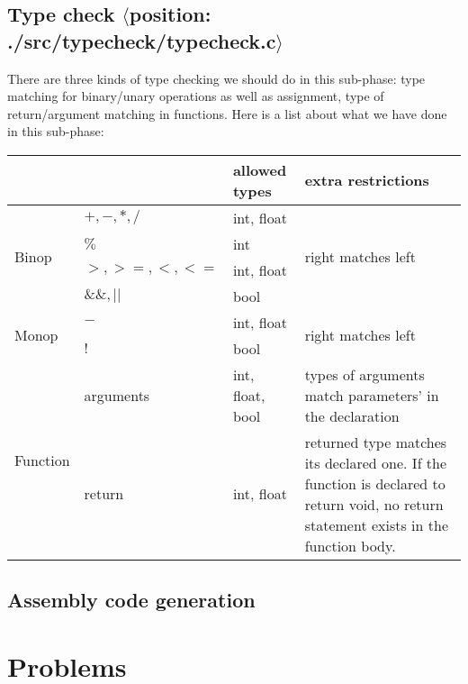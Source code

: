 \documentclass[a4paper,11pt]{article}
\begin{document}
\subsection{Type check $\langle$position: ./src/typecheck/typecheck.c$\rangle$}
There are three kinds of type checking we should do in this sub-phase: type matching for binary/unary operations as well as assignment, type of return/argument matching in functions. Here is a list about what we have done in this sub-phase:
\begin{center}
\begin{tabular}{|l|l|l|p{5cm}|}
\hline
    &   & allowed types & extra restrictions \\ \hline
\multirow{4}{*}{Binop} 
    & $+, -, *, /$ & int, float &  \multirow{4}{*}{right matches left}\\ \cline{2-3}
    & $\%$ & int & \\ \cline{2-3}
    & $>, >=, <, <=$ & int, float & \\\cline{2-3}
    & $\&\&, ||$ & bool & \\ \hline
\multirow{2}{*}{Monop}
    & $-$ & int, float & \multirow{2}{*}{right matches left} \\\cline{2-3}
    & $!$ & bool & \\ \hline
\multirow{2}{*}{Function}
    & arguments & int, float, bool & types of arguments match parameters' in the declaration \\ \cline{2-4}
    & return & int, float & returned type matches its declared one. If the function is declared to return void, no return statement exists in the function body. \\ \hline
\end{tabular}
\end{center}

\subsection{Assembly code generation}

\section{Problems}
\end{document}
